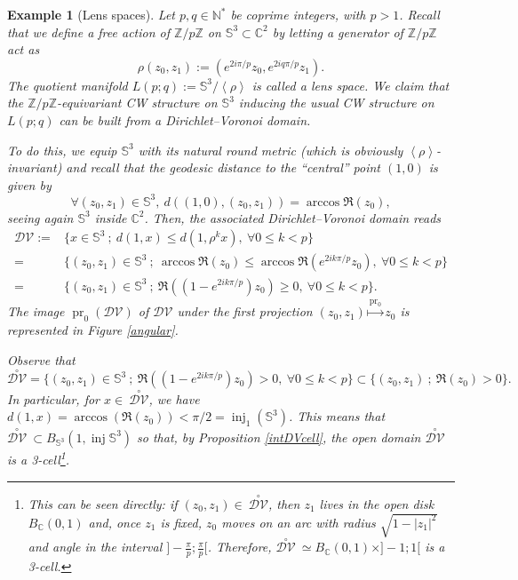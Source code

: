 \documentclass[11pt,twoside]{amsart}
\theoremstyle{plain}
\newtheorem{exemple}[prop]{Example}
\newcommand{\C}{{\mathbb C}}
\newcommand{\N}{{\mathbb N}}
\newcommand{\Z}{{\mathbb Z}}
\newcommand{\Sph}{\mathbb{S}}
\DeclareMathOperator\inj{inj}
\DeclareMathOperator\pr{pr}
\begin{document}
\begin{exemple}[Lens spaces]\label{lens_spaces}
Let $p,q\in\N^*$ be coprime integers, with $p>1$. Recall that we define a free action of $\Z/p\Z$ on $\Sph^3\subset \C^2$ by letting a generator of $\Z/p\Z$ act as
\[\rho(z_0,z_1):=(e^{2i\pi/p}z_0,e^{2iq\pi/p}z_1).\]
The quotient manifold $L(p;q):=\Sph^3/\left<\rho\right>$ is called a \emph{lens space}. We claim that the $\Z/p\Z$-equivariant CW structure on $\Sph^3$ inducing the usual CW structure on $L(p;q)$ \cite[Example 2.43]{hatcher} can be built from a Dirichlet--Voronoi domain.

To do this, we equip $\Sph^3$ with its natural round metric (which is obviously $\left<\rho\right>$-invariant) and recall that the geodesic distance to the ``central'' point $(1,0)$ is given by
\[\forall (z_0,z_1)\in\Sph^3,~d((1,0),(z_0,z_1))=\arccos\Re(z_0),\]
seeing again $\Sph^3$ inside $\C^2$. Then, the associated Dirichlet--Voronoi domain reads
\begin{align*}
\mathcal{DV}:=&\{x\in\Sph^3~;~d(1,x)\le d(1,\rho^kx),~\forall 0\le k<p\} \\
=&\{(z_0,z_1)\in\Sph^3~;~\arccos\Re(z_0)\le \arccos\Re(e^{2ik\pi/p}z_0),~\forall 0\le k<p\} \\
=&\{(z_0,z_1)\in\Sph^3~;~\Re((1-e^{2ik\pi/p})z_0)\ge0,~\forall 0\le k<p\}.
\end{align*}
The image $\pr_0(\mathcal{DV})$ of $\mathcal{DV}$ under the first projection $(z_0,z_1)\stackrel{\pr_0}\longmapsto z_0$ is represented in Figure \ref{angular}.

Observe that
\[\stackrel{\circ}{\mathcal{DV}}=\{(z_0,z_1)\in\Sph^3~;~\Re((1-e^{2ik\pi/p})z_0)>0,~\forall 0\le k<p\}\subset\{(z_0,z_1)~;~\Re(z_0)>0\}.\]
In particular, for $x\in~\stackrel{\circ}{\mathcal{DV}}$, we have $d(1,x)=\arccos(\Re(z_0))<\pi/2=\inj_1(\Sph^3)$. This means that $\stackrel{\circ}{\mathcal{DV}}~\subset B_{\Sph^3}(1,\inj\Sph^3)$ so that, by Proposition \ref{intDVcell}, the open domain $\stackrel{\circ}{\mathcal{DV}}$ is a 3-cell\footnote{This can be seen directly: if $(z_0,z_1)\in~\stackrel{\circ}{\mathcal{DV}}$, then $z_1$ lives in the open disk $B_{\C}(0,1)$ and, once $z_1$ is fixed, $z_0$ moves on an arc with radius $\sqrt{1-|z_1|^2}$ and angle in the interval $]-\tfrac{\pi}{p};\tfrac{\pi}{p}[$. Therefore, $\stackrel{\circ}{\mathcal{DV}}~\simeq B_{\C}(0,1)\times]-1;1[$ is a 3-cell.}.

\begin{center}
\begin{figure}%
\end{figure}
\end{center}
\end{exemple}
\end{document}
